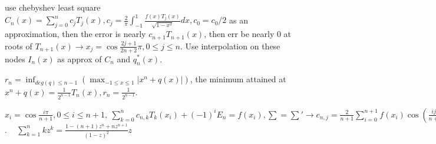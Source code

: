  use chebyshev least square $C_n(x) = \sum_{j=0}^{n}c_jT_j(x), c_j = \frac{2}{\pi}\int_{-1}^{1}\frac{f(x)T_j(x)}{\sqrt{1-x^2}}dx, c_0 = c_0/2 $ as an approximation, then the error is nearly $c_{n+1}T_{n+1}(x)$, then err be nearly $0$ at roots of $T_{n+1}(x) \to x_j = \cos\frac{2j+1}{2n+2}\pi, 0\le j\le n $. Use interpolation on these nodes $I_n(x) $ as approx of $C_n $ and $q_n^*(x) $.

 $r_n = \inf_{deg(q)\le n-1}(\max_{-1\le x\le 1}|x^n+q(x)|) $, the minimum attained at $x^n+q(x) = \frac{1}{2^{n-1}}T_n(x), r_n = \frac{1}{2^{n-1}} $.

 $x_i = \cos\frac{i\pi}{n+1}, 0\le i\le n+1, ~\sum_{k=0}^{n}c_{n,k}T_k(x_i)+(-1)^iE_n =f(x_i), \sum = \sum' \to c_{n, j} = \frac{2}{n+1}\sum_{i=0}^{n+1}f(x_i)\cos(\frac{ij\pi}{n+1}), \sum = \sum'', E_n = \frac{1}{n+1}\sum_{i=0}^{n+1}(-1)^if(x_i), \sum = \sum'' $. ~ $\sum_{k=1}^{n}kz^k = \frac{1-(n+1)z^n+nz^{n+1}}{(1-z)^2}z $
